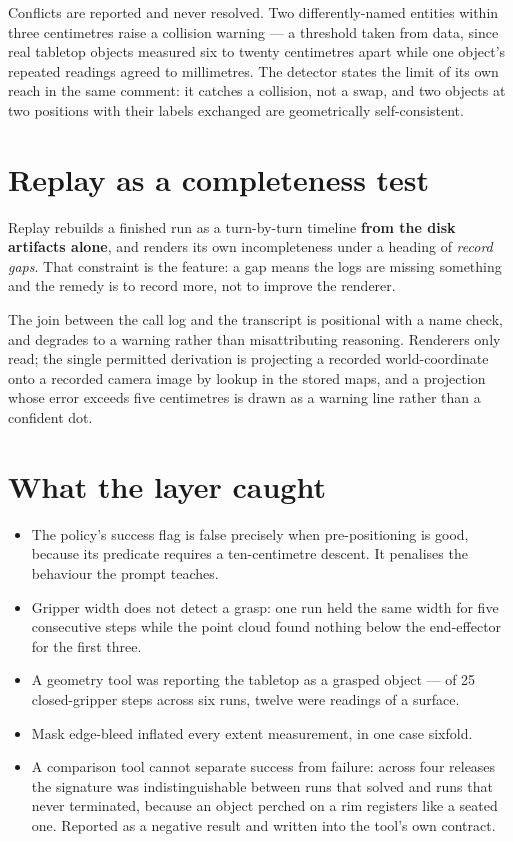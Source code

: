 \documentclass[11pt,a4paper]{report}
\begin{document}
Conflicts are reported and never resolved. Two differently-named entities within
three centimetres raise a collision warning --- a threshold taken from data,
since real tabletop objects measured six to twenty centimetres apart while one
object's repeated readings agreed to millimetres. The detector states the limit
of its own reach in the same comment: it catches a collision, not a swap, and
two objects at two positions with their labels exchanged are geometrically
self-consistent.

\section{Replay as a completeness test}

Replay rebuilds a finished run as a turn-by-turn timeline \textbf{from the disk
artifacts alone}, and renders its own incompleteness under a heading of
\emph{record gaps}. That constraint is the feature: a gap means the logs are
missing something and the remedy is to record more, not to improve the renderer.

The join between the call log and the transcript is positional with a name
check, and degrades to a warning rather than misattributing reasoning. Renderers
only read; the single permitted derivation is projecting a recorded
world-coordinate onto a recorded camera image by lookup in the stored maps, and
a projection whose error exceeds five centimetres is drawn as a warning line
rather than a confident dot.

\section{What the layer caught}

\begin{itemize}
\item The policy's success flag is false precisely when pre-positioning is good,
      because its predicate requires a ten-centimetre descent. It penalises the
      behaviour the prompt teaches.
\item Gripper width does not detect a grasp: one run held the same width for
      five consecutive steps while the point cloud found nothing below the
      end-effector for the first three.
\item A geometry tool was reporting the tabletop as a grasped object --- of 25
      closed-gripper steps across six runs, twelve were readings of a surface.
\item Mask edge-bleed inflated every extent measurement, in one case sixfold.
\item A comparison tool cannot separate success from failure: across four
      releases the signature was indistinguishable between runs that solved and
      runs that never terminated, because an object perched on a rim registers
      like a seated one. Reported as a negative result and written into the
      tool's own contract.
\end{itemize}
\end{document}
